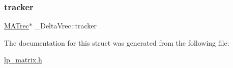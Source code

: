 \mbox{\label{struct___delta_vrec_a748b0643c039afbba7690eaa7981cce1}} 
\subsubsection{\texorpdfstring{tracker}{tracker}}
{\footnotesize\ttfamily \hyperlink{lp__matrix_8h_a5e7313f2f5107ac1c98af642b9739620}{M\+A\+Trec}$\ast$ \+\_\+\+Delta\+Vrec\+::tracker}



The documentation for this struct was generated from the following file\+:\begin{DoxyCompactItemize}
\item 
\hyperlink{lp__matrix_8h}{lp\+\_\+matrix.\+h}\end{DoxyCompactItemize}
